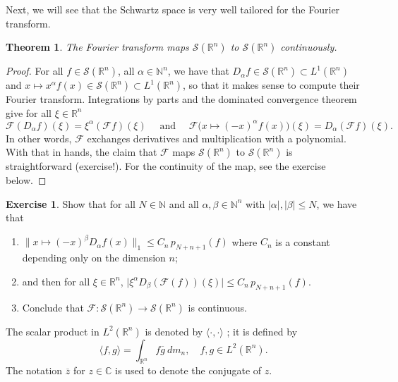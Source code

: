 \documentclass[a4paper, 12pt]{article}
\theoremstyle{plain}
\newtheorem{theorem}[proposition]{Theorem}
\theoremstyle{definition}
\newtheorem{exercise}{Exercise}
\theoremstyle{remark}
\numberwithin{equation}{section}
\begin{document}
Next, we will see that the Schwartz space is very well tailored for the Fourier transform.

\begin{theorem}
The Fourier transform maps ${\mathscr{S}}({\mathds{R}}^n)$ to ${\mathscr{S}}({\mathds{R}}^n)$ continuously.
\end{theorem}

\begin{proof}
For all $f\in{\mathscr{S}}({\mathds{R}}^n)$, all $\alpha \in {\mathds{N}}^n$, we have that
$D_\alpha f\in {\mathscr{S}}({\mathds{R}}^n)\subset L^1({\mathds{R}}^n)$
and $x \mapsto x^\alpha f(x) \in {\mathscr{S}}({\mathds{R}}^n)\subset L^1({\mathds{R}}^n)$, so that it makes sense to 
compute their Fourier transform. Integrations by parts and the dominated convergence theorem give for all $\xi\in{\mathds{R}}^n$
%
\begin{equation}
\label{eq:diff-mult}
{\mathscr{F}}(D_\alpha f) (\xi) = \xi^\alpha ({\mathscr{F}} f )(\xi) \quad \mbox{ and } \quad 
{\mathscr{F}}\bigl(x \mapsto (-x)^\alpha f(x)\bigr)(\xi) = D_\alpha ({\mathscr{F}} f)(\xi).
\end{equation}
%
In other words, ${\mathscr{F}}$ exchanges derivatives and multiplication with a polynomial. With that in hands, the claim
that ${\mathscr{F}}$ maps ${\mathscr{S}}({\mathds{R}}^n)$ to ${\mathscr{S}}({\mathds{R}}^n)$ is straightforward (exercise!). 
For the continuity of the map, see the exercise below.
\end{proof}

\begin{exercise}
Show that for all $N\in{\mathds{N}}$ and all $\alpha,\beta\in{\mathds{N}}^n$ with $|\alpha|,|\beta|\le N$, we have that
%
\begin{enumerate}
\item
$\bigl\|x\mapsto (-x)^\beta D_\alpha f(x)\bigr\|_1\le C_n \,p_{N+n+1}(f)$ where $C_n$ is a constant depending only on the dimension $n$;
\item
and then for all $\xi\in {\mathds{R}}^n$, $\bigl|\xi^\alpha D_\beta ({\mathscr{F}}(f))(\xi)\bigr|\le C_n\, p_{N+n+1}(f)$.
\item
Conclude that ${\mathscr{F}}:{\mathscr{S}}({\mathds{R}}^n)\to {\mathscr{S}}({\mathds{R}}^n)$ is continuous.
\end{enumerate}
%
\end{exercise}

\noindent
The scalar product in $L^2({\mathds{R}}^n)$ is denoted by $\langle \cdot , \cdot \rangle$ ; it is defined by
\[
\langle f,g\rangle = \int_{{\mathds{R}}^n} f \overline{g} \ dm_n, \quad f,g \in L^2({\mathds{R}}^n).
\]
The notation $\overline{z}$ for $z \in {\mathds{C}}$ is used to denote the conjugate of $z$.
\end{document}
